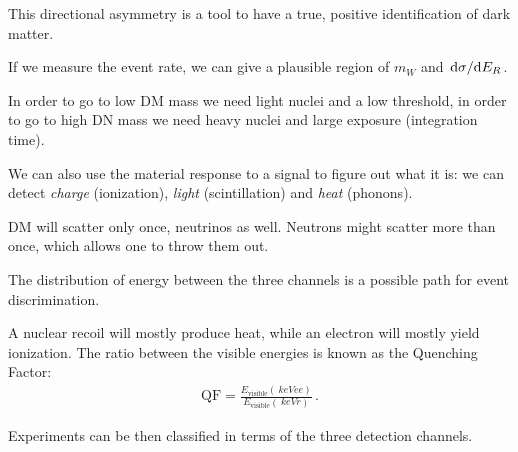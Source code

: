 \documentclass[main.tex]{subfiles}
\begin{document}
This directional asymmetry is a tool to have a true, positive identification of dark matter. 

If we measure the event rate, we can give a plausible region of \(m_W\) and \(\dv*{\sigma }{E_R}\). 

In order to go to low DM mass we need light nuclei and a low threshold, in order to go to high DN mass we need heavy nuclei and large exposure (integration time). 

We can also use the material response to a signal to figure out what it is: we can detect \emph{charge} (ionization), \emph{light} (scintillation) and \emph{heat} (phonons). 

DM will scatter only once, neutrinos as well. 
Neutrons might scatter more than once, which allows one to throw them out. 

The distribution of energy between the three channels is a possible path for event discrimination. 

A nuclear recoil will mostly produce heat, while an electron will mostly yield ionization. 
The ratio between the visible energies is known as the Quenching Factor: 
%
\begin{align}
\text{QF} = \frac{E _{\text{visible}}(\SI{}{keV} ee)}{E _{\text{visible}} (\SI{}{keV} r)}
\,.
\end{align}

Experiments can be then classified in terms of the three detection channels. 
\end{document}
